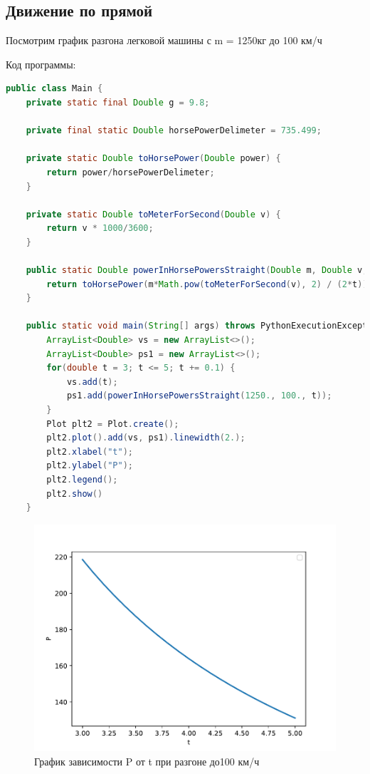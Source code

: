 \documentclass[a4paper, 14pt]{extarticle}
\begin{document}
		\subsection{Движение по прямой}
			Посмотрим график разгона легковой машины с m = 1250кг до 100 км/ч 
			
			Код программы:
			\begin{lstlisting}[language=Java]
public class Main {
	private static final Double g = 9.8;
	
	private final static Double horsePowerDelimeter = 735.499;
	
	private static Double toHorsePower(Double power) {
		return power/horsePowerDelimeter;
	}
	
	private static Double toMeterForSecond(Double v) {
		return v * 1000/3600;
	}
	
	public static Double powerInHorsePowersStraight(Double m, Double v, Double t) {
		return toHorsePower(m*Math.pow(toMeterForSecond(v), 2) / (2*t));
	}
	
	public static void main(String[] args) throws PythonExecutionException, IOException {
		ArrayList<Double> vs = new ArrayList<>();
		ArrayList<Double> ps1 = new ArrayList<>();
		for(double t = 3; t <= 5; t += 0.1) {
			vs.add(t);
			ps1.add(powerInHorsePowersStraight(1250., 100., t));
		}
		Plot plt2 = Plot.create();
		plt2.plot().add(vs, ps1).linewidth(2.);
		plt2.xlabel("t");
		plt2.ylabel("P");
		plt2.legend();
		plt2.show()
	}
			\end{lstlisting}
			\begin{figure}[H]
				\centering
				\includegraphics[width = \linewidth]{fig3.pdf}
				\caption[.] {График зависимости P от t при разгоне до100 км/ч}
			\end{figure}
\end{document}
